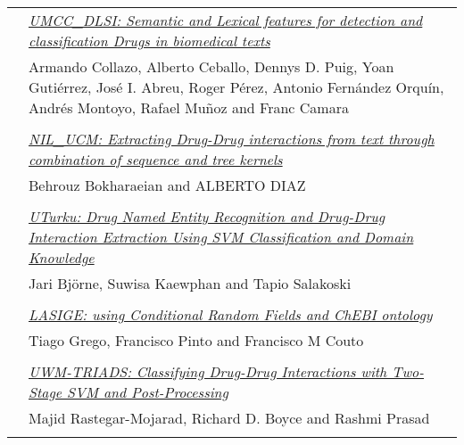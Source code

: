 \begin{tabular}{p{20mm}p{138mm}}
 & \hyperlink{page.636}{\em UMCC\_DLSI: Semantic and Lexical features for detection and classification Drugs in biomedical texts}\\
         & Armando Collazo, Alberto Ceballo, Dennys D. Puig, Yoan Guti\'{e}rrez, Jos\'{e} I. Abreu, Roger P\'{e}rez, Antonio Fern\'{a}ndez Orqu\'{i}n, Andr\'{e}s Montoyo, Rafael Mu\~{n}oz and Franc Camara \\
\\

 & \hyperlink{page.644}{\em NIL\_UCM: Extracting Drug-Drug interactions from text through combination of sequence and tree kernels}\\
         & Behrouz Bokharaeian and ALBERTO DIAZ \\
\\

 & \hyperlink{page.651}{\em UTurku: Drug Named Entity Recognition and Drug-Drug Interaction Extraction Using SVM Classification and Domain Knowledge}\\
         & Jari Bj\"{o}rne, Suwisa Kaewphan and Tapio Salakoski \\
\\

 & \hyperlink{page.660}{\em LASIGE: using Conditional Random Fields and ChEBI ontology}\\
         & Tiago Grego, Francisco Pinto and Francisco M Couto \\
\\

 & \hyperlink{page.667}{\em UWM-TRIADS: Classifying Drug-Drug Interactions with Two-Stage SVM and Post-Processing}\\
         & Majid Rastegar-Mojarad, Richard D. Boyce and Rashmi Prasad \\
\\
\end{tabular}
\newpage
